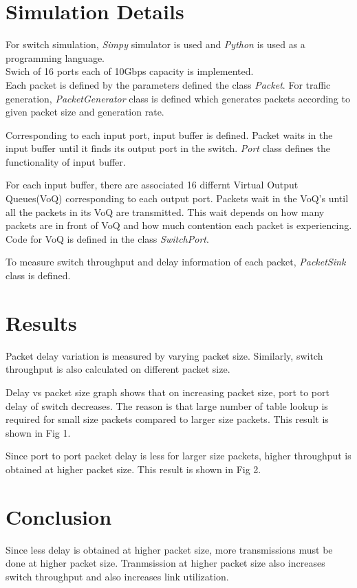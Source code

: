 \documentclass[twocolumn,10pt]{article}
\begin{document}
\section{Simulation Details}
For switch simulation, \textit{Simpy} simulator is used and \textit{Python} is used as a programming language.\\
Swich of 16 ports each of 10Gbps capacity is implemented.\\
Each packet is defined by the parameters defined the class \textit{Packet}.
For traffic generation, \textit{PacketGenerator} class is defined which generates packets according to given packet size and generation rate.

Corresponding to each input port, input buffer is defined. Packet waits in the input buffer until it finds its output port in the switch.
\textit{Port} class defines the functionality of input buffer.

For each input buffer, there are associated 16 differnt Virtual Output Queues(VoQ) corresponding to each output port.
Packets wait in the VoQ's until all the packets in its VoQ are transmitted. 
This wait depends on how many packets are in front of VoQ and how much contention each packet is experiencing.
Code for VoQ is defined in the class \textit{SwitchPort}.

To measure switch throughput and delay information of each packet, \textit{PacketSink} class is defined.

\section{Results}
Packet delay variation is measured by varying packet size. 
Similarly, switch throughput is also calculated on different packet size.
 
Delay vs packet size graph shows that on increasing packet size, port to port delay of switch decreases. 
The reason is that large number of table lookup is required for small size packets compared to larger size packets. 
This result is shown in Fig 1.

Since port to port packet delay is less for larger size packets, higher throughput is obtained at higher packet size.
This result is shown in Fig 2.

\section{Conclusion}
Since less delay is obtained at higher packet size, more transmissions must be done at higher packet size. Tranmsission at higher packet size also increases switch throughput and also increases link utilization.
\end{document}
